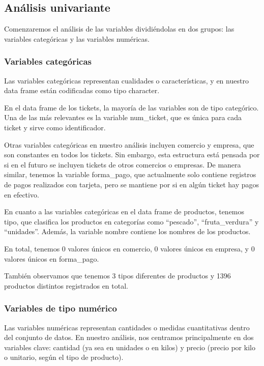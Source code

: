 \documentclass[,article,submit,moreauthors,pdftex]{Definitions/mdpi}
\begin{document}
\hypertarget{anuxe1lisis-univariante}{%
\subsection{Análisis univariante}\label{anuxe1lisis-univariante}}

Comenzaremos el análisis de las variables dividiéndolas en dos grupos:
las variables categóricas y las variables numéricas.

\hypertarget{variables-categuxf3ricas}{%
\subsubsection{Variables categóricas}\label{variables-categuxf3ricas}}

Las variables categóricas representan cualidades o características, y en
nuestro data frame están codificadas como tipo character.

En el data frame de los tickets, la mayoría de las variables son de tipo
categórico. Una de las más relevantes es la variable num\_ticket, que es
única para cada ticket y sirve como identificador.

Otras variables categóricas en nuestro análisis incluyen comercio y
empresa, que son constantes en todos los tickets. Sin embargo, esta
estructura está pensada por si en el futuro se incluyen tickets de otros
comercios o empresas. De manera similar, tenemos la variable
forma\_pago, que actualmente solo contiene registros de pagos realizados
con tarjeta, pero se mantiene por si en algún ticket hay pagos en
efectivo.

En cuanto a las variables categóricas en el data frame de productos,
tenemos tipo, que clasifica los productos en categorías como
``pescado'', ``fruta\_verdura'' y ``unidades''. Además, la variable
nombre contiene los nombres de los productos.

En total, tenemos 0 valores únicos en comercio, 0 valores únicos en
empresa, y 0 valores únicos en forma\_pago.

También observamos que tenemos 3 tipos diferentes de productos y 1396
productos distintos registrados en total.

\hypertarget{variables-de-tipo-numuxe9rico}{%
\subsubsection{Variables de tipo
numérico}\label{variables-de-tipo-numuxe9rico}}

Las variables numéricas representan cantidades o medidas cuantitativas
dentro del conjunto de datos. En nuestro análisis, nos centramos
principalmente en dos variables clave: cantidad (ya sea en unidades o en
kilos) y precio (precio por kilo o unitario, según el tipo de producto).
\end{document}
